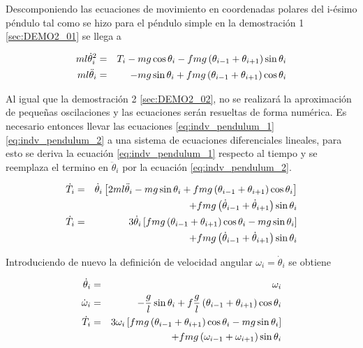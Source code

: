 \newpage

Descomponiendo las ecuaciones de movimiento en coordenadas polares del 
i-ésimo péndulo tal como se hizo para el péndulo simple en la demostración 
1 \ref{sec:DEMO2_01} se llega a 


\begin{eqnarray}
\label{eq:indv_pendulum_1}
ml\dot \theta_i^2 &=& T_i - mg \cos \theta_i - 
fmg\left(  \theta_{i-1} + \theta_{i+1}  \right)\sin \theta_i \\
\label{eq:indv_pendulum_2}
ml\ddot \theta_i &=& -mg \sin \theta_i +  
fmg\left(  \theta_{i-1} + \theta_{i+1}  \right)\cos{\theta_i}
\end{eqnarray}


Al igual que la demostración 2 \ref{sec:DEMO2_02}, no se realizará la 
aproximación de pequeñas oscilaciones y las ecuaciones serán resueltas de
forma numérica. Es necesario entonces llevar las ecuaciones \ref{eq:indv_pendulum_1}
\ref{eq:indv_pendulum_2} a una sistema de ecuaciones diferenciales lineales,
para esto se deriva la ecuación \ref{eq:indv_pendulum_1} respecto al tiempo
y se reemplaza el termino en $\ddot \theta_i$ por la ecuación 
\ref{eq:indv_pendulum_2}.


\begin{eqnarray}
\nonumber
\dot T_i &=& \dot \theta_i \left[  2ml\ddot \theta_i - mg\sin \theta_i + 
fmg\left( \theta_{i-1} + \theta_{i+1} \right)\cos{\theta_i} \right] \\
\nonumber
& &+ fmg\left( \dot \theta_{i-1} + 
\dot \theta_{i+1} \right)\sin{\theta_i} \\
\nonumber
\dot T_i &=& 3\dot \theta_i\left[  fmg \left( \theta_{i-1} + 
\theta_{i+1} \right)\cos{\theta_i} - mg \sin \theta_i   \right] \\
\label{eq:new_acopled_tension}
&& + fmg\left( \dot \theta_{i-1} + \dot\theta_{i+1} \right)\sin{\theta_i}
\end{eqnarray}


Introduciendo de nuevo la definición de velocidad angular $\omega_i = 
\dot \theta_i$ se obtiene


\begin{eqnarray}
\label{eq:Dthetai}
\dot \theta_i &=& \omega_i \\
\label{eq:Domegai}
\dot \omega_i &=& -\frac{g}{l}\sin \theta_i +  
f\frac{g}{l}\left(  \theta_{i-1} + \theta_{i+1}  \right)\cos{\theta_i} \\
\nonumber
\dot T_i &=& 3\omega_i\left[  fmg \left( \theta_{i-1} + 
\theta_{i+1} \right)\cos{\theta_i} - mg \sin \theta_i  \right] \\
\label{eq:Dtensioni}
&& + fmg\left( \omega_{i-1} + \omega_{i+1} \right)\sin{\theta_i}
\end{eqnarray}


